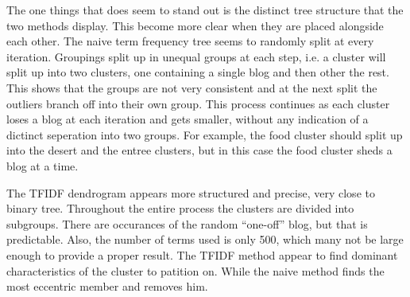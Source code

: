 The one things that does seem to stand out is the distinct tree structure that the two methods display. This become more clear when they are placed alongside each other. The naive term frequency tree seems to randomly split at every iteration. Groupings split up in unequal groups at each step, i.e. a cluster will split up into two clusters, one containing a single blog and then other the rest. This shows that the groups are not very consistent and at the next split the outliers branch off into their own group. This process continues as each cluster loses a blog at each iteration and gets smaller, without any indication of a dictinct seperation into two groups. For example, the food cluster should split up into the desert and the entree clusters, but in this case the food cluster sheds a blog at a time. 

The TFIDF dendrogram appears more structured and precise, very close to binary tree. Throughout the entire process the clusters are divided into subgroups. There are occurances of the random ``one-off'' blog, but that is predictable. Also, the number of terms used is only 500, which many not be large enough to provide a proper result.  The TFIDF method appear to find dominant characteristics of the cluster to patition on. While the naive method finds the most eccentric member and removes him. 

